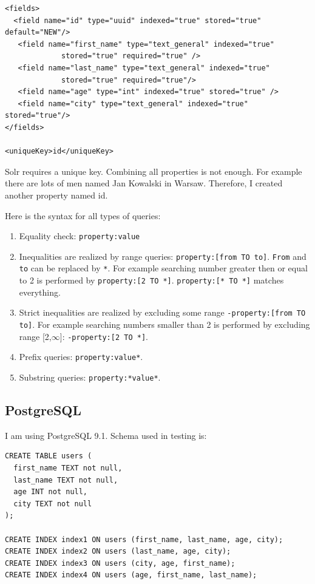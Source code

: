 \documentclass[10pt,a4paper]{article}
\begin{document}
\begin{verbatim}
<fields>
  <field name="id" type="uuid" indexed="true" stored="true" default="NEW"/>
   <field name="first_name" type="text_general" indexed="true"
             stored="true" required="true" /> 
   <field name="last_name" type="text_general" indexed="true" 
             stored="true" required="true"/>
   <field name="age" type="int" indexed="true" stored="true" /> 
   <field name="city" type="text_general" indexed="true" stored="true"/>
</fields>

<uniqueKey>id</uniqueKey> 
\end{verbatim}

Solr requires a unique key. Combining all properties is not enough. For example there are lots of men named Jan Kowalski in Warsaw. Therefore, I created another property named id.

\bigskip
Here is the syntax for all types of queries:
\begin{enumerate}
\item Equality check: \verb|property:value|
\item Inequalities are realized by range queries: \verb|property:[from TO to]|. \verb|From| and \verb|to| can be replaced by \verb|*|. For example searching number greater then or equal to 2 is performed by \verb|property:[2 TO *]|. \verb|property:[* TO *]| matches everything.
\item Strict inequalities are realized by excluding some range \verb|-property:[from TO to]|. For example searching numbers smaller than 2 is performed by excluding range [2,$\infty$]: \verb|-property:[2 TO *]|.
\item Prefix queries: \verb|property:value*|.
\item Substring queries: \verb|property:*value*|.
 
\end{enumerate}

\subsection{PostgreSQL}

I am using PostgreSQL 9.1. Schema used in testing is:

\begin{verbatim}
CREATE TABLE users (
  first_name TEXT not null,
  last_name TEXT not null,
  age INT not null,
  city TEXT not null
);

CREATE INDEX index1 ON users (first_name, last_name, age, city);
CREATE INDEX index2 ON users (last_name, age, city);
CREATE INDEX index3 ON users (city, age, first_name);
CREATE INDEX index4 ON users (age, first_name, last_name);
\end{verbatim}
\end{document}
